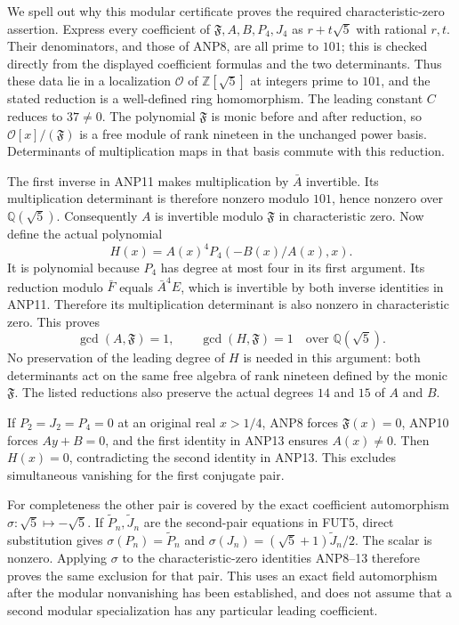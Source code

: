 \documentclass[11pt]{article}
\begin{document}
We spell out why this modular certificate proves the required
characteristic-zero assertion. Express every coefficient of
$\mathfrak F,A,B,P_4,J_4$ as $r+t\sqrt5$ with rational $r,t$.
Their denominators, and those of ANP8, are all prime to $101$;
this is checked directly from the displayed coefficient formulas
and the two determinants. Thus these data lie in a localization
$\mathcal O$ of $\mathbb Z[\sqrt5]$ at integers prime to $101$,
and the stated reduction is a well-defined ring homomorphism.
The leading constant $C$ reduces to $37\ne0$.
The polynomial $\mathfrak F$ is monic before and after reduction,
so $\mathcal O[x]/(\mathfrak F)$ is a free module of rank nineteen
in the unchanged power basis. Determinants of multiplication maps
in that basis commute with this reduction.

The first inverse in ANP11 makes multiplication by $\bar A$
invertible. Its multiplication determinant is therefore nonzero
modulo $101$, hence nonzero over $\mathbb Q(\sqrt5)$.
Consequently $A$ is invertible modulo $\mathfrak F$ in
characteristic zero. Now define the actual polynomial
\[
              H(x)=A(x)^4P_4(-B(x)/A(x),x).
 \tag{ANP12}
\]
It is polynomial because $P_4$ has degree at most four in its first
argument. Its reduction modulo $\bar F$ equals $\bar A^4 E$,
which is invertible by both inverse identities in ANP11.
Therefore its multiplication determinant is also nonzero in
characteristic zero. This proves
\[
          \gcd(A,\mathfrak F)=1,\qquad
          \gcd(H,\mathfrak F)=1
              \quad\text{over }\mathbb Q(\sqrt5).
 \tag{ANP13}
\]
No preservation of the leading degree of $H$ is needed in this
argument: both determinants act on the same free algebra of rank
nineteen defined by the monic $\mathfrak F$. The listed reductions
also preserve the actual degrees $14$ and $15$ of $A$ and $B$.

If $P_2=J_2=P_4=0$ at an original real $x>1/4$, ANP8 forces
$\mathfrak F(x)=0$, ANP10 forces $Ay+B=0$, and the first identity
in ANP13 ensures $A(x)\ne0$. Then $H(x)=0$, contradicting the
second identity in ANP13. This excludes simultaneous vanishing for
the first conjugate pair.

For completeness the other pair is covered by the exact coefficient
automorphism $\sigma:\sqrt5\mapsto-\sqrt5$.
If $\widetilde P_n,\widetilde J_n$ are the second-pair equations
in FUT5, direct substitution gives
$\sigma(P_n)=\widetilde P_n$ and
$\sigma(J_n)=(\sqrt5+1)\widetilde J_n/2$.
The scalar is nonzero. Applying $\sigma$ to the characteristic-zero
identities ANP8--13 therefore proves the same exclusion for that pair.
This uses an exact field automorphism after the modular nonvanishing
has been established, and does not assume that a second modular
specialization has any particular leading coefficient.
\end{document}
